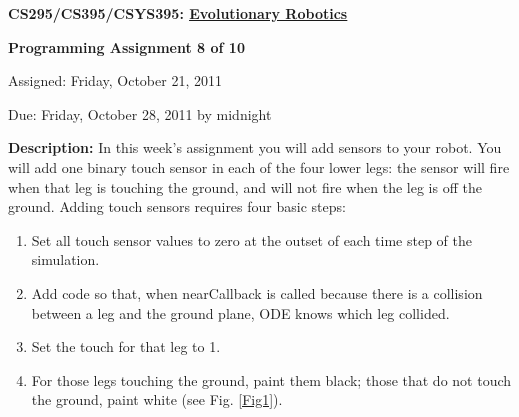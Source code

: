 \documentclass[12pt]{article}
\begin{document}
\centerline{\bf \Large CS295/CS395/CSYS395: \href{CS295_395_Syllabus.pdf}{\underline{Evolutionary Robotics}}}

\vspace{0.5cm}

\centerline{\bf \large Programming Assignment 8 of 10}

\vspace{0.5cm}

\centerline{\large Assigned: Friday, October 21, 2011}

\vspace{0.5cm}

\centerline{\large Due: Friday, October 28, 2011 by midnight}

\vspace{0.5cm}

\noindent \textbf{Description:} In this week's assignment you will add sensors to your robot. You will add one binary touch sensor in each of the four lower legs: the sensor will fire when that leg is touching the ground, and will not fire when the leg is off the ground. Adding touch sensors requires four basic steps:

\begin{enumerate}

\item Set all touch sensor values to zero at the outset of each time step of the simulation.

\item Add code so that, when nearCallback is called because there is a collision between a leg and the ground plane, ODE knows which leg collided.

\item Set the touch for that leg to 1.

\item For those legs touching the ground, paint them black; those that do not touch the ground, paint white (see Fig. \ref{Fig1}).
\end{enumerate}
\end{document}
